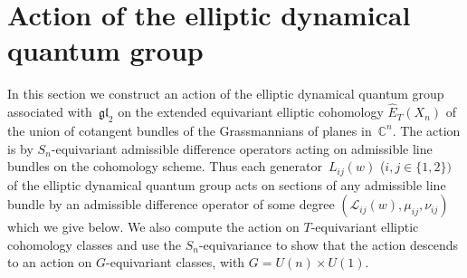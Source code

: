 \documentclass[pdftex]{sigma}
\numberwithin{equation}{section}
\begin{document}
\section{Action of the elliptic dynamical quantum group}
In this section we construct an action of the elliptic dynamical quantum group associated with~$\mathfrak{gl}_2$ on the extended equivariant elliptic cohomology $\hat E_T(X_n)$ of the union of cotangent bundles of the
Grassmannians of planes in~$\mathbb C^n$. The action is by $S_n$-equivariant admissible difference operators acting on admissible line bundles on the cohomology scheme. Thus each generator~$L_{ij}(w)$ \mbox{($i,j\in\{1,2\})$} of the elliptic dynamical quantum group acts on sections of any admissible line bundle by an admissible difference operator of some degree $(\mathcal L_{ij}(w),\mu_{ij},\nu_{ij})$ which we give below. We also compute the action on $T$-equivariant elliptic cohomology classes and use the $S_n$-equivariance to show that the action descends to an action on $G$-equivariant classes, with $G=U(n)\times U(1)$.
\end{document}
